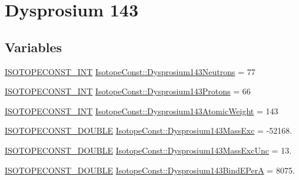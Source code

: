 \hypertarget{group___isotope_const-_dysprosium-_dy143}{}\section{Dysprosium 143}
\label{group___isotope_const-_dysprosium-_dy143}
\subsection*{Variables}
\begin{DoxyCompactItemize}
\item 
\mbox{\hyperlink{group___isotope_const-_macros_ga5f18360b3e99483a35c32d789e62621c}{I\+S\+O\+T\+O\+P\+E\+C\+O\+N\+S\+T\+\_\+\+I\+NT}} \mbox{\hyperlink{group___isotope_const-_dysprosium-_dy143_ga688977e35cd2c5ec750b75edefc77621}{Isotope\+Const\+::\+Dysprosium143\+Neutrons}} = 77
\item 
\mbox{\hyperlink{group___isotope_const-_macros_ga5f18360b3e99483a35c32d789e62621c}{I\+S\+O\+T\+O\+P\+E\+C\+O\+N\+S\+T\+\_\+\+I\+NT}} \mbox{\hyperlink{group___isotope_const-_dysprosium-_dy143_gaf8e5067bb0c895517a72363981cea99c}{Isotope\+Const\+::\+Dysprosium143\+Protons}} = 66
\item 
\mbox{\hyperlink{group___isotope_const-_macros_ga5f18360b3e99483a35c32d789e62621c}{I\+S\+O\+T\+O\+P\+E\+C\+O\+N\+S\+T\+\_\+\+I\+NT}} \mbox{\hyperlink{group___isotope_const-_dysprosium-_dy143_gaf81a09a01784acf00824641e7397063f}{Isotope\+Const\+::\+Dysprosium143\+Atomic\+Weight}} = 143
\item 
\mbox{\hyperlink{group___isotope_const-_macros_ga8f45a7272ce02c0b4c65c44636ed719a}{I\+S\+O\+T\+O\+P\+E\+C\+O\+N\+S\+T\+\_\+\+D\+O\+U\+B\+LE}} \mbox{\hyperlink{group___isotope_const-_dysprosium-_dy143_ga883be184b5841c7bb8d86974a865f13a}{Isotope\+Const\+::\+Dysprosium143\+Mass\+Exc}} = -\/52168.
\item 
\mbox{\hyperlink{group___isotope_const-_macros_ga8f45a7272ce02c0b4c65c44636ed719a}{I\+S\+O\+T\+O\+P\+E\+C\+O\+N\+S\+T\+\_\+\+D\+O\+U\+B\+LE}} \mbox{\hyperlink{group___isotope_const-_dysprosium-_dy143_ga4bde7de71a232ca7027689e75c555e9b}{Isotope\+Const\+::\+Dysprosium143\+Mass\+Exc\+Unc}} = 13.
\item 
\mbox{\hyperlink{group___isotope_const-_macros_ga8f45a7272ce02c0b4c65c44636ed719a}{I\+S\+O\+T\+O\+P\+E\+C\+O\+N\+S\+T\+\_\+\+D\+O\+U\+B\+LE}} \mbox{\hyperlink{group___isotope_const-_dysprosium-_dy143_gaa1c24a006d3079035eab9edc0eaa3094}{Isotope\+Const\+::\+Dysprosium143\+Bind\+E\+PerA}} = 8075.

\end{DoxyCompactItemize}
